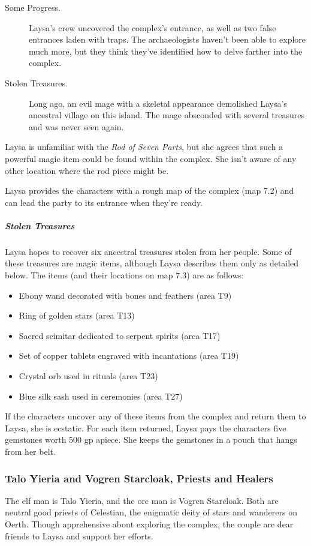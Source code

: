 \documentclass[10pt,a4paper,twoside,bg=print,twocolumn,openany,nodeprecatedcode]{dndbook}
\begin{document}
\begin{description}
\item[Some Progress.]
Laysa's crew uncovered the complex's entrance, as well as two false entrances laden with traps. The archaeologists haven't been able to explore much more, but they think they've identified how to delve farther into the complex.
\item[Stolen Treasures.]
Long ago, an evil mage with a skeletal appearance demolished Laysa's ancestral village on this island. The mage absconded with several treasures and was never seen again.
\end{description}

Laysa is unfamiliar with the \textit{Rod of Seven Parts}, but she agrees that such a powerful magic item could be found within the complex. She isn't aware of any other location where the rod piece might be.

Laysa provides the characters with a rough map of the complex (map 7.2) and can lead the party to its entrance when they're ready.

\subparagraph{Stolen Treasures}
Laysa hopes to recover six ancestral treasures stolen from her people. Some of these treasures are magic items, although Laysa describes them only as detailed below. The items (and their locations on map 7.3) are as follows:


\begin{itemize}
\item Ebony wand decorated with bones and feathers (area T9)
\item Ring of golden stars (area T13)
\item Sacred scimitar dedicated to serpent spirits (area T17)
\item Set of copper tablets engraved with incantations (area T19)
\item Crystal orb used in rituals (area T23)
\item Blue silk sash used in ceremonies (area T27)
\end{itemize}

If the characters uncover any of these items from the complex and return them to Laysa, she is ecstatic. For each item returned, Laysa pays the characters five gemstones worth 500 gp apiece. She keeps the gemstones in a pouch that hangs from her belt.

\subsubsection{Talo Yieria and Vogren Starcloak, Priests and Healers}
The elf man is Talo Yieria, and the orc man is Vogren Starcloak. Both are neutral good priests of Celestian, the enigmatic deity of stars and wanderers on Oerth. Though apprehensive about exploring the complex, the couple are dear friends to Laysa and support her efforts.
\end{document}

